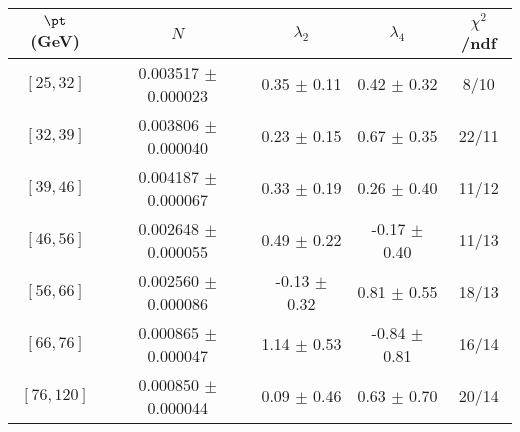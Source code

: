 \begin{tabular}{c||c|c|c|c}
$\pt$ (GeV) & $N$ & $\lambda_{2}$ & $\lambda_4$  & $\chi^2$/ndf  \\
\hline
$[25, 32]$ & 0.003517 $\pm$ 0.000023 & 0.35 $\pm$ 0.11 & 0.42 $\pm$ 0.32 & 8/10\\
$[32, 39]$ & 0.003806 $\pm$ 0.000040 & 0.23 $\pm$ 0.15 & 0.67 $\pm$ 0.35 & 22/11\\
$[39, 46]$ & 0.004187 $\pm$ 0.000067 & 0.33 $\pm$ 0.19 & 0.26 $\pm$ 0.40 & 11/12\\
$[46, 56]$ & 0.002648 $\pm$ 0.000055 & 0.49 $\pm$ 0.22 & -0.17 $\pm$ 0.40 & 11/13\\
$[56, 66]$ & 0.002560 $\pm$ 0.000086 & -0.13 $\pm$ 0.32 & 0.81 $\pm$ 0.55 & 18/13\\
$[66, 76]$ & 0.000865 $\pm$ 0.000047 & 1.14 $\pm$ 0.53 & -0.84 $\pm$ 0.81 & 16/14\\
$[76, 120]$ & 0.000850 $\pm$ 0.000044 & 0.09 $\pm$ 0.46 & 0.63 $\pm$ 0.70 & 20/14\\
\end{tabular}
